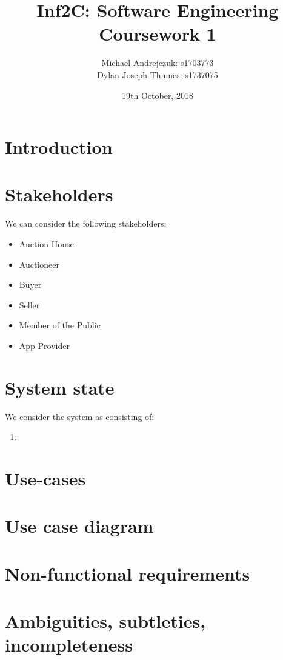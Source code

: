 \documentclass{article}
\begin{document}
\title{Inf2C: Software Engineering \\Coursework 1}
\author{Michael Andrejczuk: s1703773 \\
  Dylan Joseph Thinnes: s1737075}
\date{19th October, 2018}
\maketitle

\section{Introduction}

\section{Stakeholders}
We can consider the following stakeholders:
\begin{itemize}
\item Auction House
\item Auctioneer
\item Buyer
\item Seller
\item Member of the Public
\item App Provider
\end{itemize}
\section{System state}
We consider the system as consisting of:
\begin{enumerate}
\item
\end{enumerate}
\section{Use-cases}

\section{Use case diagram}

\section{Non-functional requirements}

\section{Ambiguities, subtleties, incompleteness}
\end{document}
